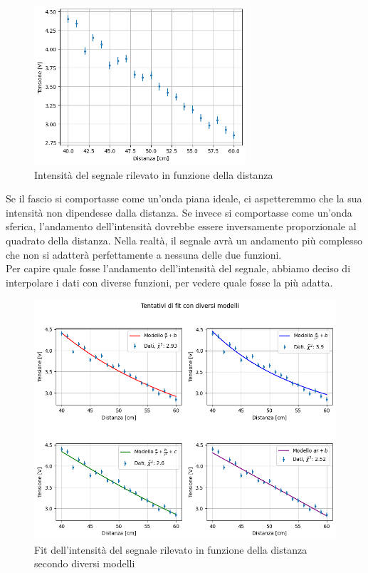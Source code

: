 \documentclass[letterpaper,12pt]{article}
\begin{document}
\begin{figure}[h!]
    \centering
    \includegraphics[width = 0.7\textwidth]{dati_distanza.png}
    \caption{Intensità del segnale rilevato in funzione della distanza}
    \label{fig:distanza}
\end{figure}

Se il fascio si comportasse come un'onda piana ideale, ci aspetteremmo che la sua intensità non dipendesse dalla distanza.
Se invece si comportasse come un'onda sferica, l'andamento dell'intensità dovrebbe essere inversamente proporzionale
al quadrato della distanza. Nella realtà, il segnale avrà un andamento più complesso che non si adatterà perfettamente
a nessuna delle due funzioni.\\
Per capire quale fosse l'andamento dell'intensità del segnale, abbiamo deciso di interpolare i dati con diverse funzioni,
per vedere quale fosse la più adatta.\\ 

\begin{figure}[h!]
    \centering
    \includegraphics[width = .9\textwidth]{fit_distanza_vari_modelli.png}
    \caption{Fit dell'intensità del segnale rilevato in funzione della distanza secondo diversi modelli}
    \label{fig:fit_distanza_vari_modelli}
\end{figure}
\end{document}
